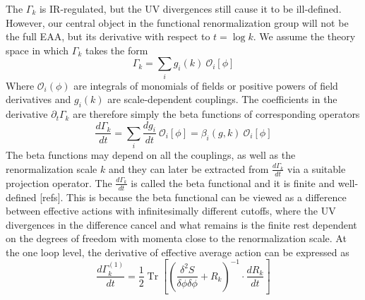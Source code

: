 \documentclass[11pt, a4paper]{article}
\begin{document}



The $\Gamma_k$ is IR-regulated, but the UV divergences still cause it to be ill-defined. 
However, our central object in the functional renormalization group will not be the full EAA, 
but its derivative with respect to $t = \log{k}$.
We assume the theory space in which $\Gamma_k$ takes the form
\begin{equation}
    \Gamma_k = \sum_i g_i(k) \ \mathcal{O}_i [\phi]
    \label{gamma_decomp}
\end{equation}
Where $\mathcal{O}_i (\phi)$ are integrals of monomials of fields or positive powers of field derivatives 
and $g_i(k)$ are scale-dependent couplings.
The coefficients in the derivative $\partial_t \Gamma_k$ are therefore simply the beta functions of corresponding operators
\begin{equation}
    \frac{d \Gamma_k}{dt} = \sum_i \frac{d g_i}{dt} \ \mathcal{O}_i [\phi] = \beta_i(g,k) \ \mathcal{O}_i [\phi]
\end{equation}
The beta functions may depend on all the couplings, as well as the renormalization scale $k$ and
they can later be extracted from $\frac{d \Gamma_k}{dt}$ via a suitable projection operator. 
The $\frac{d \Gamma_k}{dt}$ is called the beta functional and it is finite and well-defined [refs].
This is because the beta functional can be viewed as a difference between effective actions with infinitesimally
different cutoffs, where the UV divergences in the difference cancel and what remains is the finite rest
dependent on the degrees of freedom with momenta close to the renormalization scale.
At the one loop level, the derivative of effective average action can be expressed as
\begin{equation}
    \frac{d \Gamma_k^{(1)}}{dt} = \frac{1}{2} \operatorname{Tr} \left[ \left(\frac{\delta^2 S}{\delta \phi \delta \phi} + R_k\right)^{-1} \cdot \frac{d R_k}{dt} \right]
\end{equation}
\end{document}
